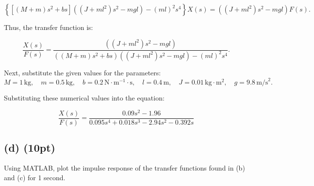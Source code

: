 \documentclass[12pt]{article}
\begin{document}
\[
\left\{ \left[ \left( M + m \right) s^2 + b s \right] ((J + ml^2) s^2 - mgl) - (ml)^2 s^4 \right\} X(s) = ((J + ml^2) s^2 - mgl) F(s).
\]

Thus, the transfer function is:

\[
\frac{X(s)}{F(s)} = \frac{((J + ml^2) s^2 - mgl)}{((M + m)s^2 + bs)((J + ml^2) s^2 - mgl) - (ml)^2 s^4}.
\]

Next, substitute the given values for the parameters:
\[
M = 1 \, \text{kg}, \quad m = 0.5 \, \text{kg}, \quad b = 0.2 \, \text{N} \cdot \text{m}^{-1} \cdot \text{s}, \quad l = 0.4 \, \text{m}, \quad J = 0.01 \, \text{kg} \cdot \text{m}^2, \quad g = 9.8 \, \text{m/s}^2.
\]

Substituting these numerical values into the equation:


\[
\boxed{\frac{X(s)}{F(s)} = \frac{0.09 s^2 - 1.96}{0.095 s^4 + 0.018 s^3 - 2.94 s^2 - 0.392 s}}
\]

\newpage

\subsection*{(d) (10pt)}

Using MATLAB, plot the impulse response of the transfer functions found in (b) and (c) for 1 second.
\end{document}
